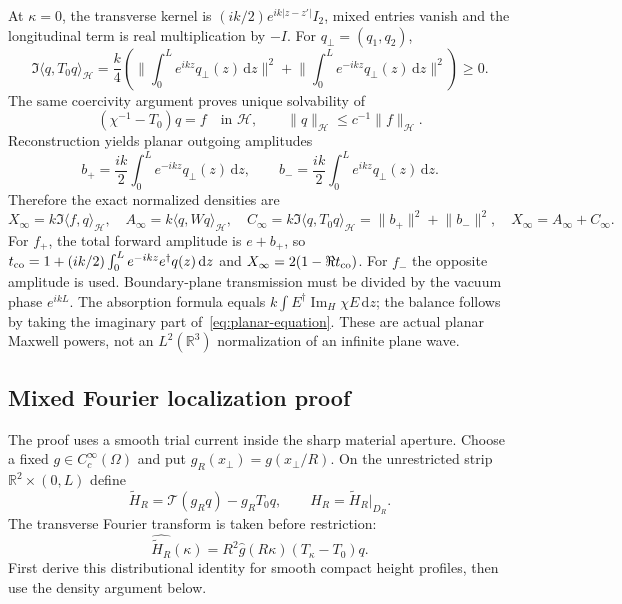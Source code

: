 \documentclass[11pt,a4paper]{article}
\theoremstyle{remark}
\newcommand{\norm}[1]{\lVert #1\rVert}
\newcommand{\abs}[1]{\lvert #1\rvert}
\newcommand{\ip}[2]{\langle #1,#2\rangle}
\newcommand{\dd}{\,\mathrm d}
\newcommand{\ImH}{\operatorname{Im}_{H}}
\begin{document}
At $\kappa=0$, the transverse kernel is $(ik/2)e^{ik\abs{z-z'}}I_2$, mixed entries vanish and the longitudinal term is real multiplication by $-I$. For $q_\perp=(q_1,q_2)$,
\begin{equation}\label{eq:planar-radiation}
 \Im\ip q{T_0q}_{\mathcal H}
 =\frac k4\left(\norm{\int_0^Le^{ikz}q_\perp(z)\dd z}^2
 +\norm{\int_0^Le^{-ikz}q_\perp(z)\dd z}^2\right)\geq0.
\end{equation}
The same coercivity argument proves unique solvability of
\begin{equation}\label{eq:planar-equation}
 (\chi^{-1}-T_0)q=f\quad\text{in }\mathcal H,\qquad
 \norm q_{\mathcal H}\leq c^{-1}\norm f_{\mathcal H}.
\end{equation}
Reconstruction yields planar outgoing amplitudes
\[
 b_+=\frac{ik}{2}\int_0^Le^{-ikz}q_\perp(z)\dd z,\qquad
 b_-=\frac{ik}{2}\int_0^Le^{ikz}q_\perp(z)\dd z.
\]
Therefore the exact normalized densities are
\begin{equation}\label{eq:planar-powers}
 X_\infty=k\Im\ip fq_{\mathcal H},\quad
 A_\infty=k\ip q{Wq}_{\mathcal H},\quad
 C_\infty=k\Im\ip q{T_0q}_{\mathcal H}=\norm{b_+}^2+\norm{b_-}^2,
 \quad X_\infty=A_\infty+C_\infty.
\end{equation}
For $f_+$, the total forward amplitude is $e+b_+$, so $t_{\rm co}=1+(ik/2)\int_0^Le^{-ikz}e^\dagger q(z)\dd z$ and $X_\infty=2(1-\Re t_{\rm co})$. For $f_-$ the opposite amplitude is used. Boundary-plane transmission must be divided by the vacuum phase $e^{ikL}$. The absorption formula equals $k\int E^\dagger\ImH\chi E\dd z$; the balance follows by taking the imaginary part of~\eqref{eq:planar-equation}. These are actual planar Maxwell powers, not an $L^2(\mathbb R^3)$ normalization of an infinite plane wave.

\subsection{Mixed Fourier localization proof}
The proof uses a smooth trial current inside the sharp material aperture. Choose a fixed $g\in C_c^\infty(\Omega)$ and put $g_R(x_\perp)=g(x_\perp/R)$. On the unrestricted strip $\mathbb R^2\times(0,L)$ define
\[
 \widetilde H_R=\mathcal T(g_Rq)-g_RT_0q,\qquad H_R=\widetilde H_R|_{D_R}.
\]
The transverse Fourier transform is taken before restriction:
\begin{equation}\label{eq:commutator}
 \widehat{\widetilde H_R}(\kappa)=R^2\widehat g(R\kappa)(T_\kappa-T_0)q.
\end{equation}
First derive this distributional identity for smooth compact height profiles, then use the density argument below.
\end{document}
